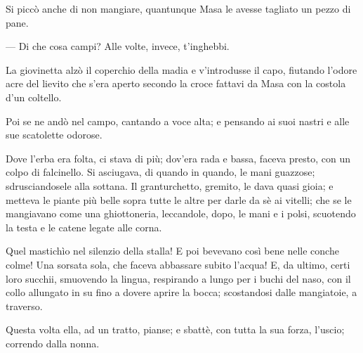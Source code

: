 Si piccò anche di non mangiare, quantunque Masa le avesse tagliato un pezzo di pane.

— Di che cosa campi? Alle volte, invece, t'inghebbi.

La giovinetta alzò il coperchio della madia e v'introdusse il capo, fiutando l'odore acre del lievito che s'era aperto secondo la croce fattavi da Masa con la costola d'un coltello.

Poi se ne andò nel campo, cantando a voce alta; e pensando ai suoi nastri e alle sue scatolette odorose.

Dove l’erba era folta, ci stava di più; dov’era rada e bassa, faceva presto, con un colpo di falcinello. Si asciugava, di quando in quando, le mani guazzose; sdrusciandosele alla sottana. Il granturchetto, gremito, le dava quasi gioia; e metteva le piante più belle sopra tutte le altre per darle da sè ai vitelli; che se le mangiavano come una ghiottoneria, leccandole, dopo, le mani e i polsi, scuotendo la testa e le catene legate alle corna.

Quel mastichìo nel silenzio della stalla! E poi bevevano così bene nelle conche colme! Una sorsata sola, che faceva abbassare subito l’acqua! E, da ultimo, certi loro succhii, smuovendo la lingua, respirando a lungo per i buchi del naso, con il collo allungato in su fino a dovere aprire la bocca; scostandosi dalle mangiatoie, a traverso.

Questa volta ella, ad un tratto, pianse; e sbattè, con tutta la sua forza, l’uscio; correndo dalla nonna.

